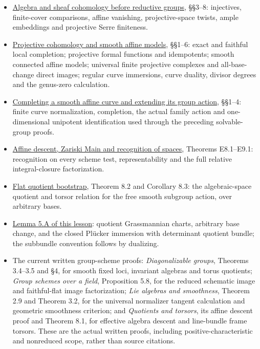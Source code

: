 \documentclass[11pt,a4paper,openany]{report}
\providecommand{\tightlist}{\setlength{\itemsep}{0pt}\setlength{\parskip}{0pt}}
\begin{document}
\begin{itemize}
\tightlist
\item
  \href{https://github.com/KokunoYumeto/open-math-courses/blob/main/docs/courses/AG-RG/AG-RG-S01.md}{Algebra and sheaf cohomology before reductive groups}, §§3--8: injectives, finite-cover comparisons, affine vanishing, projective-space twists, ample embeddings and projective Serre finiteness.
\item
  \href{https://github.com/KokunoYumeto/open-math-courses/blob/main/docs/courses/AG-RG/AG-RG-S02.md}{Projective cohomology and smooth affine models}, §§1--6: exact and faithful local completion; projective formal functions and idempotents; smooth connected affine models; universal finite projective complexes and all-base-change direct images; regular curve immersions, curve duality, divisor degrees and the genus-zero calculation.
\item
  \href{https://github.com/KokunoYumeto/open-math-courses/blob/main/docs/courses/AG-RG/AG-RG-S03.md}{Completing a smooth affine curve and extending its group action}, §§1--4: finite curve normalization, completion, the actual family action and one-dimensional unipotent identification used through the preceding solvable-group proofs.
\item
  \href{https://github.com/KokunoYumeto/open-math-courses/blob/main/docs/courses/AG-RG/AG-RG-S04.md}{Affine descent, Zariski Main and recognition of spaces}, Theorems E8.1--E9.1: recognition on every scheme test, representability and the full relative integral-closure factorization.
\item
  \href{https://github.com/KokunoYumeto/open-math-courses/blob/main/docs/courses/AG-RG/AG-RG-S07.md}{Flat quotient bootstrap}, Theorem 8.2 and Corollary 8.3: the algebraic-space quotient and torsor relation for the free smooth subgroup action, over arbitrary bases.
\item
  \hyperref[AG-RG-03-ag-rg-03-grassmannian]{Lemma 5.A of this lesson}: quotient Grassmannian charts, arbitrary base change, and the closed Plücker immersion with determinant quotient bundle; the subbundle convention follows by dualizing.
\item
  The current written group-scheme proofs: \emph{Diagonalizable groups}, Theorems 3.4--3.5 and §4, for smooth fixed loci, invariant algebras and torus quotients; \emph{Group schemes over a field}, Proposition 5.8, for the reduced schematic image and faithful-flat image factorization; \emph{Lie algebras and smoothness}, Theorem 2.9 and Theorem 3.2, for the universal normalizer tangent calculation and geometric smoothness criterion; and \emph{Quotients and torsors}, its affine descent proof and Theorem 8.1, for effective algebra descent and line-bundle frame torsors. These are the actual written proofs, including positive-characteristic and nonreduced scope, rather than source citations.
\end{itemize}
\end{document}
